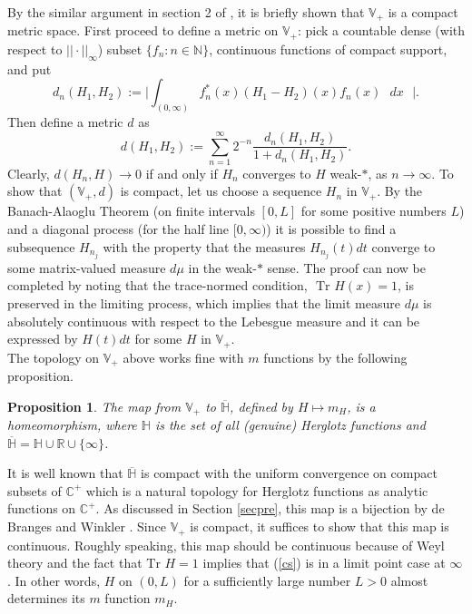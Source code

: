 \documentclass[preprint,12pt]{elsarticle}
\newtheorem{Proposition}[Theorem]{Proposition}
\newcommand{\R}{{\mathbb R}}
\newcommand{\C}{{\mathbb C}}
\newcommand{\N}{{\mathbb N}}
\newcommand{\V}{{\mathbb V}}
\begin{document}
By the similar argument in section 2 of \cite{Remcont}, it is briefly shown that $\V_+$ is a compact metric space. First proceed to define a metric on $\V_+$: pick a countable dense (with respect to $|| \cdot ||_{\infty}$) subset $\{ f_n: n\in\N \}$, continuous functions of compact support, and put 
\begin{equation*}
d_n(H_1, H_2):= \Big| \int_{(0,\infty)} f_n^*(x) (H_1-H_2)(x) f_n(x)\textrm{ } dx \textrm{ } \Big|. 
\end{equation*}
Then define a metric $d$ as
\begin{equation*}
d(H_1, H_2):=\sum_{n=1}^{\infty} 2^{-n} \frac{d_n(H_1, H_2)}{1+d_n(H_1, H_2)}. 
\end{equation*}
Clearly, $d(H_n,H)\to 0$ if and only if $H_n$ converges to $H$ weak-$*$, as $n\to\infty$. To show that $(\V_+,d)$ is compact, let us  choose a sequence $H_n$ in $\V_+$. By the Banach-Alaoglu Theorem (on finite intervals $[0,L]$ for some positive numbers $L$) and a diagonal process (for the half line $[0,\infty)$) it is possible to find a subsequence $H_{n_j}$ with the property that the measures $H_{n_j}(t)dt$ converge to some matrix-valued measure $d\mu$ in the weak-$*$ sense. The proof can now be completed by noting that the trace-normed condition, $\textrm{ Tr }H(x)= 1$, is preserved in the limiting process, which implies that the limit measure $d\mu$ is absolutely continuous with respect to the Lebesgue measure and it can be expressed by $H(t)dt$ for some $H$ in $\V_+$.\\

The topology on $\V_+$ above works fine with $m$ functions by the following proposition. 
\begin{Proposition}\label{CovofH}
The map from $\V_+$ to $\overline{\mathbb H}$, defined by $H\mapsto m_H$, is a homeomorphism, where $\mathbb H$ is the set of all (genuine) Herglotz functions and $\overline{\mathbb H}=\mathbb H \cup\R\cup \{ \infty \}$.
\end{Proposition}
It is well known that $\overline{\mathbb H}$ is compact with the uniform convergence on compact subsets of $\C^+$ which is a natural topology for Herglotz functions as analytic functions on $\C^+$. As discussed in Section \ref{secpre}, this map is a bijection by de Branges \cite{deB} and Winkler \cite{Win}. Since $\V_+$ is compact, it suffices to show that this map is continuous. Roughly speaking, this map should be continuous because of Weyl theory and the fact that $\textrm{Tr }H=1$ implies that (\ref{cs}) is in a limit point case at $\infty$. In other words, $H$ on $(0,L)$ for a sufficiently large number $L>0$ almost determines its $m$ function $m_H$.
\end{document}
